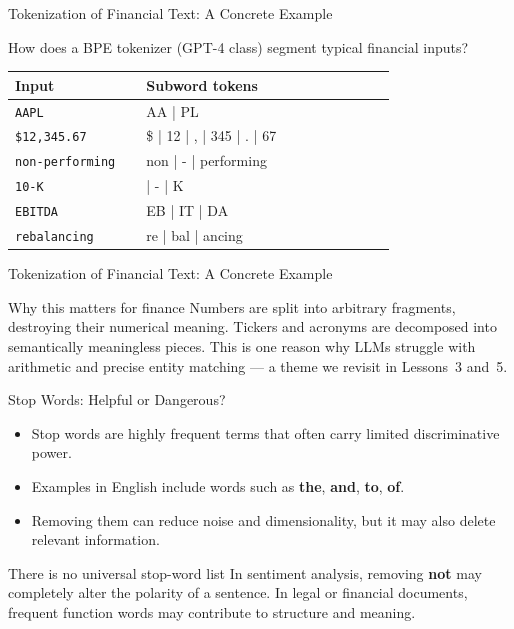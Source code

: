 \documentclass[aspectratio=169]{beamer}
\begin{document}
%
%
\begin{frame}{Tokenization of Financial Text: A Concrete Example}

How does a BPE tokenizer (GPT-4 class) segment typical financial inputs?

\vspace{0.15cm}
\begin{center}
\renewcommand{\arraystretch}{1.35}
\begin{tabular}{>{\raggedright\arraybackslash}p{0.30\linewidth}
                >{\ttfamily\raggedright\arraybackslash}p{0.58\linewidth}}
\toprule
\textbf{Input} & \textbf{Subword tokens} \\
\midrule
\texttt{AAPL}           & AA | PL \\
\texttt{\$12,345.67}    & \$ | 12 | , | 345 | . | 67 \\
\texttt{non-performing} & non | - | performing \\
\texttt{10-K}           & 10 | - | K \\
\texttt{EBITDA}         & EB | IT | DA \\
\texttt{rebalancing}    & re | bal | ancing \\
\bottomrule
\end{tabular}
\end{center}
\end{frame}
%
%
\begin{frame}{Tokenization of Financial Text: A Concrete Example}
\vspace{0.12cm}
\begin{alertblock}{Why this matters for finance}
Numbers are split into arbitrary fragments, destroying their numerical meaning.
Tickers and acronyms are decomposed into semantically meaningless pieces.
This is one reason why LLMs struggle with arithmetic and precise entity matching
--- a theme we revisit in Lessons~3 and~5.
\end{alertblock}
\end{frame}
%
%
\begin{frame}{Stop Words: Helpful or Dangerous?}
\begin{itemize}
    \item Stop words are highly frequent terms that often carry limited discriminative power.
    \item Examples in English include words such as \textbf{the}, \textbf{and}, \textbf{to}, \textbf{of}.
    \item Removing them can reduce noise and dimensionality, but it may also delete relevant information.
\end{itemize}

\vspace{0.15cm}
\begin{alertblock}{There is no universal stop-word list}
In sentiment analysis, removing \textbf{not} may completely alter the polarity of a sentence. In legal or financial documents, frequent function words may contribute to structure and meaning.
\end{alertblock}
\end{frame}
\end{document}

